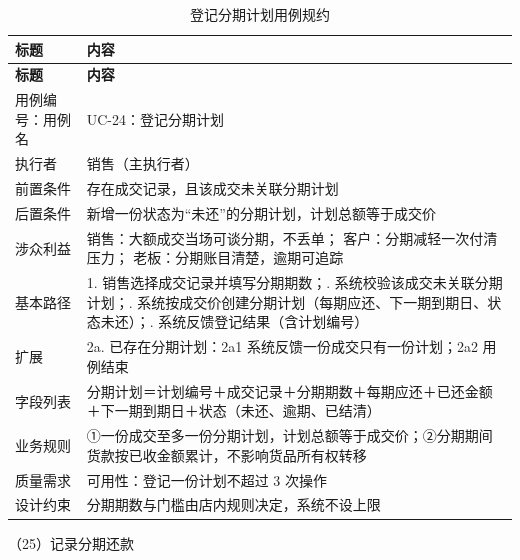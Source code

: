 {\small
\begin{longtable}{@{}L{3.0cm} L{12.3cm}@{}}
\caption{登记分期计划用例规约}\label{tab:uc-24}\\
\toprule
\textbf{标题} & \textbf{内容} \\
\midrule
\endfirsthead
\toprule
\textbf{标题} & \textbf{内容} \\
\midrule
\endhead
用例编号：用例名 & UC-24：登记分期计划 \\
\midrule
执行者 & 销售（主执行者） \\
\midrule
前置条件 & 存在成交记录，且该成交未关联分期计划 \\
\midrule
后置条件 & 新增一份状态为“未还”的分期计划，计划总额等于成交价 \\
\midrule
涉众利益 & 销售：大额成交当场可谈分期，不丢单；\newline
客户：分期减轻一次付清压力；\newline
老板：分期账目清楚，逾期可追踪 \\
\midrule
基本路径 & 1. 销售选择成交记录并填写分期期数；. 系统校验该成交未关联分期计划；. 系统按成交价创建分期计划（每期应还、下一期到期日、状态未还）；. 系统反馈登记结果（含计划编号） \\
\midrule
扩展 & 2a. 已存在分期计划：2a1 系统反馈一份成交只有一份计划；2a2 用例结束 \\
\midrule
字段列表 & 分期计划＝计划编号＋成交记录＋分期期数＋每期应还＋已还金额＋下一期到期日＋状态（未还、逾期、已结清） \\
\midrule
业务规则 & ①一份成交至多一份分期计划，计划总额等于成交价；\newline ②分期期间货款按已收金额累计，不影响货品所有权转移 \\
\midrule
质量需求 & 可用性：登记一份计划不超过 3 次操作 \\
\midrule
设计约束 & 分期期数与门槛由店内规则决定，系统不设上限 \\
\midrule
\bottomrule
\end{longtable}}

\noindent（25）记录分期还款

